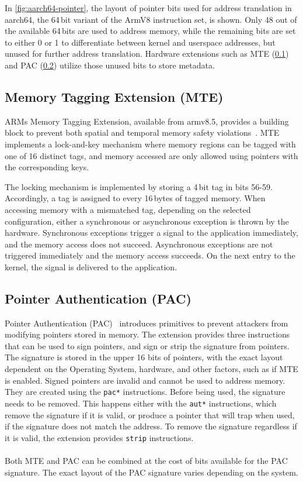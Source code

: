 In \cref{fig:aarch64-pointer}, the layout of pointer bits used for address translation in aarch64, the 64\,bit variant of the ArmV8 instruction set, is shown.
Only 48 out of the available 64\,bits are used to address memory, while the remaining bits are set to either 0 or 1 to differentiate between kernel and userspace addresses, but unused for further address translation.
 Hardware extensions such as MTE (\cref{subsec:mte}) and PAC (\cref{subsec:pac}) utilize those unused bits to store metadata.

\subsection{Memory Tagging Extension (MTE)}
\label{subsec:mte}

ARMs Memory Tagging Extension, available from armv8.5, provides a building block to prevent both spatial and temporal memory safety violations~\cite{ARM2019MTE}.
MTE implements a lock-and-key mechanism where memory regions can be tagged with one of 16 distinct tags, and memory accessed are only allowed using pointers with the corresponding keys.

The locking mechanism is implemented by storing a 4\,bit tag in bits 56-59.
Accordingly, a tag is assigned to every 16\,bytes of tagged memory.
When accessing memory with a mismatched tag, depending on the selected configuration, either a synchronous or asynchronous exception is thrown by the hardware.
Synchronous exceptions trigger a signal to the application immediately, and the memory access does not succeed.
Asynchronous exceptions are not triggered immediately and the memory access succeeds.
On the next entry to the kernel, the signal is delivered to the application.

\subsection{Pointer Authentication (PAC)}
\label{subsec:pac}

Pointer Authentication (PAC)~\cite{Qualcomm2017PointerAuth} introduces primitives to prevent attackers from modifying pointers stored in memory.
The extension provides three instructions that can be used to sign pointers, and sign or strip the signature from pointers.
The signature is stored in the upper 16 bits of pointers, with the exact layout dependent on the Operating System, hardware, and other factors, such as if MTE is enabled.
Signed pointers are invalid and cannot be used to address memory.
They are created using the \texttt{pac*} instructions.
Before being used, the signature needs to be removed.
This happens either with the \texttt{aut*} instructions, which remove the signature if it is valid, or produce a pointer that will trap when used, if the signature does not match the address.
To remove the signature regardless if it is valid, the extension provides \texttt{strip} instructions.

\paragraph{} Both MTE and PAC can be combined at the cost of bits available for the PAC signature.
The exact layout of the PAC signature varies depending on the system.


